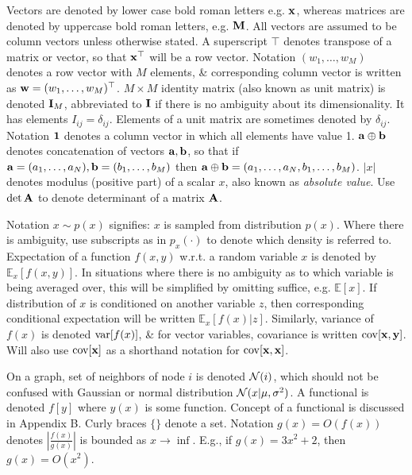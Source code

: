 \documentclass{article}
\begin{document}
\begin{itemize}
	Vectors are denoted by lower case bold roman letters e.g. ${\bf x}$, whereas matrices are denoted by uppercase bold roman letters, e.g. ${\bf M}$. All vectors are assumed to be column vectors unless otherwise stated. A superscript $\top$ denotes transpose of a matrix or vector, so that ${\bf x}^\top$ will be a row vector. Notation $(w_1,\ldots,w_M)$ denotes a row vector with $M$ elements, \& corresponding column vector is written as ${\bf w} = (w_1,\ldots,w_M)^\top$. $M\times M$ identity matrix (also known as unit matrix) is denoted ${\bf I}_M$, abbreviated to ${\bf I}$ if there is no ambiguity about its dimensionality. It has elements $I_{ij} = \delta_{ij}$. Elements of a unit matrix are sometimes denoted by $\delta_{ij}$. Notation ${\bf1}$ denotes a column vector in which all elements have value 1. ${\bf a}\oplus{\bf b}$ denotes concatenation of vectors ${\bf a},{\bf b}$, so that if ${\bf a} = (a_1,\ldots,a_N),{\bf b} = (b_1,\ldots,b_M)$ then ${\bf a}\oplus{\bf b} = (a_1,\ldots,a_N,b_1,\ldots,b_M)$. $|x|$ denotes modulus (positive part) of a scalar $x$, also known as {\it absolute value}. Use $\det{\bf A}$ to denote determinant of a matrix ${\bf A}$.

	Notation $x\sim p(x)$ signifies: $x$ is sampled from distribution $p(x)$. Where there is ambiguity, use subscripts as in $p_x(\cdot)$ to denote which density is referred to. Expectation of a function $f(x,y)$ w.r.t. a random variable $x$ is denoted by $\mathbb{E}_x[f(x,y)]$. In situations where there is no ambiguity as to which variable is being averaged over, this will be simplified by omitting suffice, e.g. $\mathbb{E}[x]$. If distribution of $x$ is conditioned on another variable $z$, then corresponding conditional expectation will be written $\mathbb{E}_x[f(x)|z]$. Similarly, variance of $f(x)$ is denoted ${\rm var}[f(x)]$, \& for vector variables, covariance is written ${\rm cov}[{\bf x},{\bf y}]$. Will also use ${\rm cov}[{\bf x}]$ as a shorthand notation for ${\rm cov}[{\bf x},{\bf x}]$.

	On a graph, set of neighbors of node $i$ is denoted ${\cal N}(i)$, which should not be confused with Gaussian or normal distribution ${\cal N}(x|\mu,\sigma^2)$. A functional is denoted $f[y]$ where $y(x)$ is some function. Concept of a functional is discussed in Appendix B. Curly braces $\{\}$ denote a set. Notation $g(x) = O(f(x))$ denotes $\left|\frac{f(x)}{g(x)}\right|$ is bounded as $x\to\inf$. E.g., if $g(x) = 3x^2 + 2$, then $g(x) = O(x^2)$.


\end{itemize}
\end{document}
